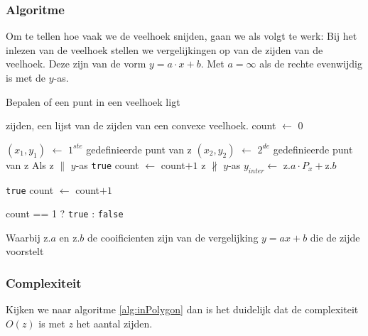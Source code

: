 \subsubsection{Algoritme}
Om te tellen hoe vaak we de veelhoek snijden, gaan we als volgt te werk:
Bij het inlezen van de veelhoek stellen we vergelijkingen op van de zijden van de 
veelhoek. Deze zijn van de vorm $y=a \cdot x+b$. Met $a = \infty$ als de rechte evenwijdig is met de $y$-as. 



	\begin{algorithm}[H]
	 	\caption{Bepalen of een punt in een veelhoek ligt}
		\begin{algorithmic}
		\Require zijden, een lijst van de zijden van een convexe veelhoek.
		\State count $\gets$ 0
		
		\State $(x_1,y_1)$ $\gets$ $1^{ste}$ gedefinieerde punt van z
		\State $(x_2,y_2)$ $\gets$ $2^{de}$ gedefinieerde punt van z
		 	\Comment Als z $\parallel$ $y$-as 
			\State \Return \texttt{true} 
				\State count $\gets$ count$+1$
			\EndIf
		\Else	\Comment z $\not \parallel$ $y$-as
			\State $y_{inter}  \gets$ z.$a\cdot P_x +$z.$b$
			
				\State \Return \texttt{true} 
				\State count $\gets$ count$+1$
			\EndIf
				
			\EndIf
		\EndIf	

		\EndFor		

		\Return count == 1 ? \texttt{true} : \texttt{false}
		\EndFunction
		\end{algorithmic}
		\label{alg:inPolygon}
	\end{algorithm}		

Waarbij z$.a$ en z$.b$ de cooificienten zijn van de vergelijking $y=ax+b$ die de zijde 
voorstelt 

\subsubsection{Complexiteit}
Kijken we naar algoritme \ref{alg:inPolygon} dan is het duidelijk dat de complexiteit $O(z)$ is met $z$ het aantal zijden.


